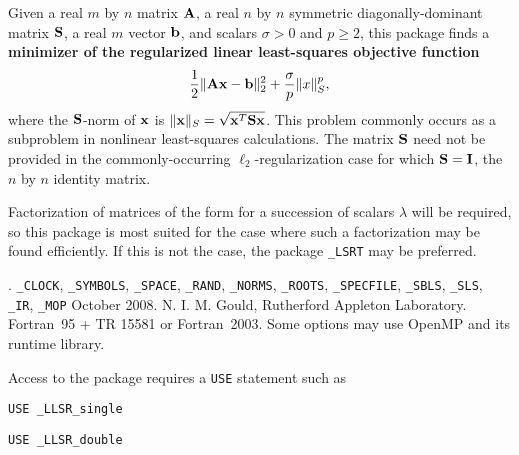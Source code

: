 \documentclass{galahad}
\newcommand{\packagename}{LLSR}
\newcommand{\fullpackagename}{\libraryname\_\packagename}
\begin{document}
\galheader


\galsummary
Given a real $m$ by $n$ matrix ${\mathbf{A}}$,
a real $n$ by $n$ symmetric diagonally-dominant matrix ${\mathbf{S}}$,
a real $m$ vector ${\mathbf{b}}$, and scalars $\sigma>0$ and $p \geq 2$, 
this package finds a
{\bf minimizer of the regularized linear least-squares objective function}
$$\frac{1}{2} \| {\mathbf{A}} {\mathbf{x}}  - {\mathbf{b}} \|^2_2 + \frac{\sigma}{p}\|x\|_S^p,$$
where the ${\mathbf{S}}$-norm of ${\mathbf{x}}$ is $\|{\mathbf{x}}\|_S = \sqrt{{\mathbf{x}}^T {\mathbf{S}} {\mathbf{x}}}$.
This problem commonly occurs as a subproblem in nonlinear
least-squares calculations.
The matrix ${\mathbf{S}}$ need not be provided in the commonly-occurring
$\ell_2$-regularization case for which ${\mathbf{S}} = {\mathbf{I}}$, the $n$ by $n$
identity matrix.

\noindent
Factorization of matrices of the form
for a succession
of scalars $\lambda$ will be required, so this package is most suited
for the case where such a factorization may be found efficiently. If
this is not the case, the package {\tt \libraryname\_LSRT} may be preferred.



\galattributes
\galversions{\tt  \fullpackagename\_single, \fullpackagename\_double}.
\galuses
{\tt \libraryname\_CLOCK},
{\tt \libraryname\_SY\-M\-BOLS},
{\tt \libraryname\_SPACE}, {\tt \libraryname\_\-RAND},
{\tt \libraryname\_\-NORMS},
{\tt \libraryname\_ROOTS}, {\tt \libraryname\_SPECFILE},
{\tt \libraryname\_SBLS},
{\tt \libraryname\_SLS}, {\tt \libraryname\_IR},
{\tt \libraryname\_MOP}
\galdate October 2008.
\galorigin N. I. M. Gould, Rutherford Appleton Laboratory.
\gallanguage Fortran~95 + TR 15581 or Fortran~2003.
\galparallelism Some options may use OpenMP and its runtime library.


\galhowto

Access to the package requires a {\tt USE} statement such as

\medskip{}

\hskip0.5in {\tt USE \fullpackagename\_single}

\medskip{}

\hskip0.5in {\tt USE  \fullpackagename\_double}
\end{document}
